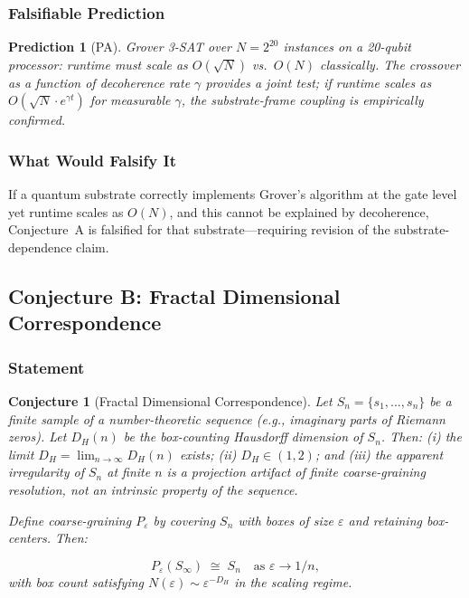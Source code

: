 \documentclass[12pt]{article}
\theoremstyle{lawstyle}
\theoremstyle{conjstyle}
\newtheorem{conjecture}{Conjecture}[section]
\theoremstyle{predstyle}
\newtheorem{prediction}{Prediction}
\begin{document}
\subsubsection*{Falsifiable Prediction}

\begin{prediction}[PA]
Grover 3-SAT over $N = 2^{20}$ instances on a 20-qubit processor: runtime must scale as
$O(\sqrt{N})$ vs.\ $O(N)$ classically. The crossover as a function of decoherence rate
$\gamma$ provides a joint test; if runtime scales as $O(\sqrt{N} \cdot e^{\gamma t})$ for
measurable $\gamma$, the substrate-frame coupling is empirically confirmed.
\end{prediction}

\subsubsection*{What Would Falsify It}

If a quantum substrate correctly implements Grover's algorithm at the gate level yet runtime
scales as $O(N)$, and this cannot be explained by decoherence, Conjecture~A is falsified for
that substrate---requiring revision of the substrate-dependence claim.

\bigskip

\subsection{Conjecture B: Fractal Dimensional Correspondence}

\subsubsection*{Statement}

\begin{conjecture}[Fractal Dimensional Correspondence]
Let $S_n = \{s_1, \ldots, s_n\}$ be a finite sample of a number-theoretic sequence (e.g.,
imaginary parts of Riemann zeros). Let $D_H(n)$ be the box-counting Hausdorff dimension of
$S_n$. Then: (i) the limit $D_H = \lim_{n\to\infty} D_H(n)$ exists; (ii) $D_H \in (1,2)$;
and (iii) the apparent irregularity of $S_n$ at finite $n$ is a projection artifact of
finite coarse-graining resolution, not an intrinsic property of the sequence.

Define coarse-graining $P_\varepsilon$ by covering $S_n$ with boxes of size $\varepsilon$
and retaining box-centers. Then:
\begin{conjbox}
\[
  P_\varepsilon(S_\infty) \;\cong\; S_n \quad \text{as } \varepsilon \to 1/n,
\]
with box count satisfying $N(\varepsilon) \sim \varepsilon^{-D_H}$ in the scaling regime.
\end{conjbox}
\end{conjecture}
\end{document}
